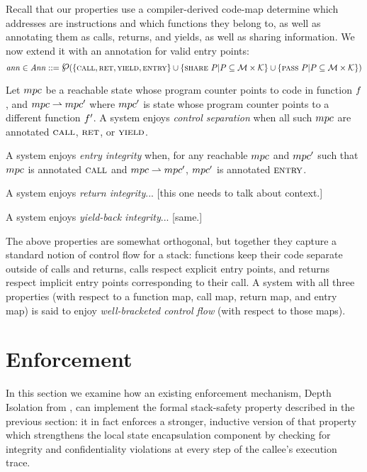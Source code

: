 \documentclass[acmsmall,review,anonymous]{acmart}\settopmatter{printfolios=true,printccs=false,printacmref=false}
\newcommand{\powerset}{\raisebox{.15\baselineskip}{\Large\ensuremath{\wp}}}
\begin{document}
Recall that our properties use a compiler-derived code-map determine
which addresses are instructions and which functions they belong to, as well
as annotating them as calls, returns, and yields, as well as sharing information.
We now extend it with an annotation for valid entry points:
\[\ann \in \ANNS ::= \powerset(\{\callmap, \retmap, \yieldmap, \entmap\} \cup
\{\sharemap ~ P | P \subseteq \MACHS \times \COMPONENTS \} \cup
\{\passmap ~ P | P \subseteq \MACHS \times \COMPONENTS \})\]


Let \(mpc\) be a reachable state whose program counter points to code in
function \(f\), and \(mpc \overset{}{\rightharpoonup} mpc'\) where
\(mpc'\) is state whose program counter points to a different function
\(f'\). A system enjoys {\em control separation} when all such \(mpc\)
are annotated \(\text{\sc call}\), \(\text{\sc ret}\), or \(\text{\sc yield}\).

A system enjoys {\em entry integrity} when, for any reachable \(mpc\) and
\(mpc'\) such that \(mpc\) is annotated \(\text{\sc call}\) and
\(mpc \overset{}{\rightharpoonup} mpc'\), \(mpc'\) is annotated \(\text{\sc entry}\).

A system enjoys {\em return integrity}... [this one needs to talk about context.]

A system enjoys {\em yield-back integrity}... [same.]

The above properties are somewhat orthogonal, but together they
capture a standard notion of control flow for a stack: functions keep
their code separate outside of calls and returns, calls respect
explicit entry points, and returns respect implicit entry points
corresponding to their call.  A system with all three
properties (with respect to a function map, call map, return map,
and entry map) is said to enjoy
{\em well-bracketed control flow} (with respect to those maps).

\section{Enforcement}
\label{sec:enforcement}

In this section we examine how an existing enforcement mechanism,
Depth Isolation from \citet{DBLP:conf/sp/RoesslerD18}, can implement
the formal stack-safety property described in the previous section: it in
fact enforces a stronger, inductive version of that property which strengthens the
local state encapsulation component by checking for integrity and
confidentiality violations at every step of the callee's execution trace.
\end{document}
